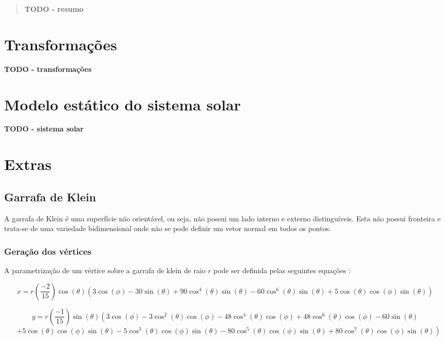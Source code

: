 \documentclass[12pt, a4paper]{article}
\begin{document}
\pagebreak

\begin{abstract}
    \textbf{\color{red} TODO - resumo}
\end{abstract}

\section{Transformações}

\textbf{\color{red} TODO - transformações}

\section{Modelo estático do sistema solar}

\textbf{\color{red} TODO - sistema solar}

\section{Extras}

\subsection{Garrafa de Klein}

A garrafa de Klein é uma superfície não orientável, ou seja, não possui um lado interno e externo
distinguíveis. Esta não possui fronteira e trata-se de uma variedade bidimensional onde não se pode
definir um vetor normal em todos os pontos.

\subsubsection{Geração dos vértices}

A parametrização de um vértice sobre a garrafa de klein de raio $r$ pode ser definida pelas
seguintes equações \cite{bottleKlein}:

$$
x = r \left( \frac{-2}{15} \right) \cos(\theta) \left(3 \cos(\phi) - 30 \sin(\theta) +
90 \cos^4(\theta) \sin(\theta) - 60 \cos^6(\theta) \sin(\theta) +
5 \cos(\theta) \cos(\phi) \sin(\theta) \right)
$$

$$
y = r \left( \frac{-1}{15} \right) \sin(\theta) \left( 3 \cos(\phi) - 3 \cos^2(\theta) \cos(\phi)
- 48 \cos^4(\theta) \cos(\phi) + 48 \cos^6(\theta) \cos(\phi) - 60 \sin(\theta) \right.
$$
$$
\quad \left. + 5 \cos(\theta) \cos(\phi) \sin(\theta) - 5 \cos^3(\theta) \cos(\phi) \sin(\theta)
- 80 \cos^5(\theta) \cos(\phi) \sin(\theta) + 80 \cos^7(\theta) \cos(\phi) \sin(\theta) \right)
$$
\end{document}
